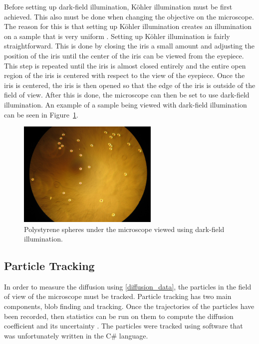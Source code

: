 \documentclass[11pt,letterpaper]{article}
\begin{document}
Before setting up dark-field illumination, K\"{o}hler illumination must be first
achieved. This also must be done when changing the objective on the microscope.
The reason for this is that setting up K\"{o}hler illumination creates an
illumination on a sample that is very uniform \cite{KohlerWiki}. Setting up
K\"{o}hler illumination is fairly straightforward. This is done by closing the
iris a small amount and adjusting the position of the iris until the center of
the iris can be viewed from the eyepiece. This step is repeated until the iris
is almost closed entirely and the entire open region of the iris is centered
with respect to the view of the eyepiece. Once the iris is centered, the iris is
then opened so that the edge of the iris is outside of the field of view. After
this is done, the microscope can then be set to use dark-field illumination. An
example of a sample being viewed with dark-field illumination can be seen in
Figure~\ref{darkfieldsphere}.

\begin{figure}
    \centering
    \includegraphics[width=0.6\textwidth]{figures/IMG_0029.JPG}
    \caption{Polystyrene spheres under the microscope viewed using dark-field
    illumination.}
    \label{darkfieldsphere}
\end{figure}

\subsection{Particle Tracking}

In order to measure the diffusion using \eqref{diffusion_data}, the particles in
the field of view of the microscope must be tracked. Particle tracking has two
main components, blob finding and tracking. Once the trajectories of the
particles have been recorded, then statistics can be run on them to compute the
diffusion coefficient and its uncertainty \cite{LabSoftware}. The particles were
tracked using software that was unfortunately written in the C\# language.\\
\end{document}

